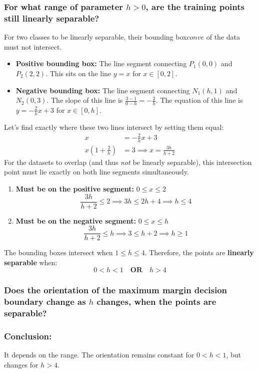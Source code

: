 \documentclass[twoside, 10pt]{article}
\begin{document}
\subsubsection{For what range of parameter \texorpdfstring{$h > 0$}{h > 0}, are the training points still linearly separable?}
For two classes to be linearly separable, their bounding box\(conve\) of the data must not intersect. 
\begin{itemize}
    \item \textbf{Positive bounding box:} The line segment connecting $P_1(0,0)$ and $P_2(2,2)$. This sits on the line $y = x$ for $x \in [0, 2]$.
    \item \textbf{Negative bounding box:} The line segment connecting $N_1(h,1)$ and $N_2(0,3)$. The slope of this line is $\frac{3-1}{0-h} = -\frac{2}{h}$. The equation of this line is $y = -\frac{2}{h}x + 3$ for $x \in [0, h]$.
\end{itemize}
Let's find exactly where these two lines intersect by setting them equal:
\begin{align*}
    x &= -\frac{2}{h}x + 3 \\
    x \left(1 + \frac{2}{h}\right) &= 3 \implies x = \frac{3h}{h + 2}
\end{align*}
For the datasets to overlap (and thus \textit{not} be linearly separable), this intersection point must lie exactly on both line segments simultaneously.
\begin{enumerate}
    \item \textbf{Must be on the positive segment:} $0 \le x \le 2$
    \[ \frac{3h}{h + 2} \le 2 \implies 3h \le 2h + 4 \implies h \le 4 \]
    \item \textbf{Must be on the negative segment:} $0 \le x \le h$
    \[ \frac{3h}{h + 2} \le h \implies 3 \le h + 2 \implies h \ge 1 \]
\end{enumerate}
The bounding boxes intersect when $1 \le h \le 4$. Therefore, the points are \textbf{linearly separable} when:
\[ 0 < h < 1 \quad \textbf{OR} \quad h > 4 \]
\subsubsection{Does the orientation of the maximum margin decision boundary change as \texorpdfstring{$h$}{h} changes, when the points are separable?}
\subsubsection*{Conclusion:} It depends on the range. The orientation remains constant for $0 < h < 1$, but changes for $h > 4$. 
\end{document}
